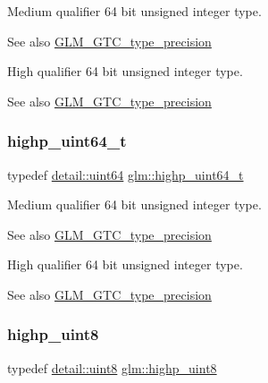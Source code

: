Medium qualifier 64 bit unsigned integer type. \begin{DoxySeeAlso}{See also}
\mbox{\hyperlink{group__gtc__type__precision}{G\+L\+M\+\_\+\+G\+T\+C\+\_\+type\+\_\+precision}}
\end{DoxySeeAlso}
High qualifier 64 bit unsigned integer type. \begin{DoxySeeAlso}{See also}
\mbox{\hyperlink{group__gtc__type__precision}{G\+L\+M\+\_\+\+G\+T\+C\+\_\+type\+\_\+precision}} 
\end{DoxySeeAlso}
\mbox{\label{group__gtc__type__precision_ga6e66f40c5909bfc872b068187fa6029e}} 
\subsubsection{\texorpdfstring{highp\+\_\+uint64\+\_\+t}{highp\_uint64\_t}}
{\footnotesize\ttfamily typedef \mbox{\hyperlink{namespaceglm_1_1detail_adec4b19bf4982125e122db2fe03c5810}{detail\+::uint64}} \mbox{\hyperlink{group__gtc__type__precision_ga6e66f40c5909bfc872b068187fa6029e}{glm\+::highp\+\_\+uint64\+\_\+t}}}

Medium qualifier 64 bit unsigned integer type. \begin{DoxySeeAlso}{See also}
\mbox{\hyperlink{group__gtc__type__precision}{G\+L\+M\+\_\+\+G\+T\+C\+\_\+type\+\_\+precision}}
\end{DoxySeeAlso}
High qualifier 64 bit unsigned integer type. \begin{DoxySeeAlso}{See also}
\mbox{\hyperlink{group__gtc__type__precision}{G\+L\+M\+\_\+\+G\+T\+C\+\_\+type\+\_\+precision}} 
\end{DoxySeeAlso}
\mbox{\label{group__gtc__type__precision_ga2c27c6dd26e893786f04b10f99c1ee95}} 
\subsubsection{\texorpdfstring{highp\+\_\+uint8}{highp\_uint8}}
{\footnotesize\ttfamily typedef \mbox{\hyperlink{namespaceglm_1_1detail_aef2588f97d090cc19fbbe0c74fe17c8f}{detail\+::uint8}} \mbox{\hyperlink{group__gtc__type__precision_ga2c27c6dd26e893786f04b10f99c1ee95}{glm\+::highp\+\_\+uint8}}}

